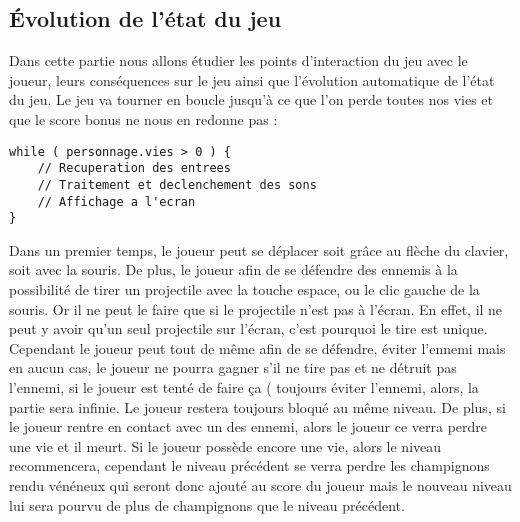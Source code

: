 \documentclass[a4paper, 12pt, twoside]{article}
\begin{document}
\subsection{Évolution de l'état du jeu}

Dans cette partie nous allons étudier les points d'interaction du jeu avec le joueur, leurs conséquences sur le jeu ainsi que l'évolution automatique de l'état du jeu. 
Le jeu va tourner en boucle jusqu'à ce que l'on perde toutes nos vies et que le score bonus ne nous en redonne pas :
\begin{lstlisting}
while ( personnage.vies > 0 ) {
	// Recuperation des entrees
	// Traitement et declenchement des sons
	// Affichage a l'ecran
}
\end{lstlisting}
Dans un premier temps, le joueur peut se déplacer soit grâce au flèche du clavier, soit avec la souris. De plus, le joueur afin de se défendre des ennemis à la possibilité de tirer un projectile avec la touche espace, ou le clic gauche de la souris. Or il ne peut le faire que si le projectile n'est pas à l'écran. En effet, il ne peut y avoir qu'un seul projectile sur l'écran, c'est pourquoi le tire est unique. Cependant le joueur peut tout de même afin de se défendre, éviter l'ennemi mais en aucun cas, le joueur ne pourra gagner s'il ne tire pas et ne détruit pas l'ennemi, si le joueur est tenté de faire ça ( toujours éviter l'ennemi, alors, la partie sera infinie. Le joueur restera toujours bloqué au même niveau. De plus, si le joueur rentre en contact avec un des ennemi, alors le joueur ce verra perdre une vie et il meurt. Si le joueur possède encore une vie, alors le niveau recommencera, cependant le niveau précédent se verra perdre les champignons rendu vénéneux qui seront donc ajouté au score du joueur mais le nouveau niveau lui sera pourvu de plus de champignons que le niveau précédent. 
\end{document}
